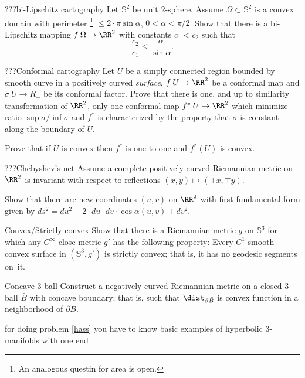 
\begin{pr}{}{???bi-Lipschitz cartography} Let $\mathbb{S}^2$ be unit $2$-sphere.
Assume $\Omega\subset \mathbb{S}^2$ is a convex domain with perimeter%
\footnote{An analogous questin for area is open.}
$\le 2\cdot\pi\sin\alpha$, $0<\alpha<\pi/2$.
Show that there is a bi-Lipschitz mapping $f\:\Omega\to \RR^2$
with constants $c_1 < c_2$ such that
$$\frac{c_2}{c_1}\le \frac{\alpha}{\sin\alpha}.$$
\end{pr}


\begin{pr}{}{???Conformal cartography}
Let $U$ be a simply connected region
bounded by smooth curve in a positively curved \emph{surface}, $f\:U\to \RR^2$
be a conformal map and $\sigma\:U\to R_+$ be its conformal factor.
Prove that there is one, and up to similarity transformation of $\RR^2$,
only one conformal map $f^*\:U\to \RR^2$ which minimize ratio
$\sup\sigma/\inf\sigma$ and $f^*$ is characterized by the property that $\sigma$
is constant along the boundary of $U$.

Prove that if $U$ is convex then $f^*$
is one-to-one and $f^*(U)$ is convex.
\end{pr}

\begin{pr}{}{???Chebyshev's net}
Assume a complete positively curved Riemannian metric on $\RR^2$ is invariant with respect to reflections $(x,y)\mapsto (\pm x,\mp y)$.

Show that there are new coordinates $(u,v)$ on $\RR^2$ with first fundamental form given by
\def\d{d}
$\d s^2=\d u^2+2\cdot\d u\cdot\d v\cdot \cos\alpha(u,v)+\d v^2$.
\end{pr}

\begin{pr}{}{Convex/Strictly convex}\label{strict-convex} 
Show that there is a Riemannian metric $g$ on $\mathbb{S}^3$ for which any  $C^\infty$-close metric $g'$ has the following property: 
Every $C^1$-smooth convex surface in $(\mathbb{S}^3,g')$ is strictly convex; 
that is, it has no geodesic segments on~it.
\sign{}
\end{pr}

\begin{pr}{\thm}{Concave 3-ball}\label{hass}
Construct a negatively curved Riemannian metric on a closed 3-ball $\bar B$ with concave boundary; 
that is, such that  $\dist_{\partial \bar B}$ is convex function in a neighborhood of $\partial \bar B$.
\end{pr}
for doing problem \ref{hass} you have to know basic examples of hyperbolic 3-manifolds with one end









